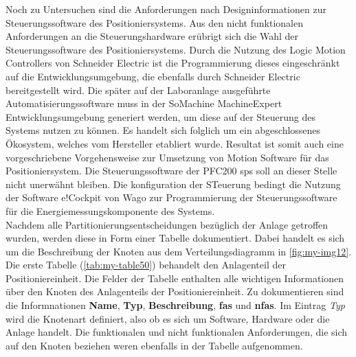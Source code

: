 \documentclass[../Bachelorarbeit.tex]{subfiles}
\begin{document}
Noch zu Untersuchen sind die Anforderungen nach Designinformationen zur Steuerungssoftware des Positioniersystems. Aus den nicht funktionalen Anforderungen an die Steuerungshardware erübrigt sich die Wahl der Steuerungssoftware des Positioniersystems. Durch die Nutzung des Logic Motion Controllers von Schneider Electric ist die Programmierung dieses eingeschränkt auf die Entwicklungsumgebung, die ebenfalls durch Schneider Electric bereitgestellt wird. Die später auf der Laboranlage ausgeführte Automatisierungssoftware muss in der SoMachine \bzw MachineExpert Entwicklungsumgebung generiert werden, um diese auf der Steuerung des Systems nutzen zu können. Es handelt sich folglich um ein abgeschlossenes Ökosystem, welches vom Hersteller etabliert wurde. Resultat ist somit auch eine vorgeschriebene Vorgehensweise zur Umsetzung von Motion Software für das Positioniersystem. Die Steuerungssoftware der PFC200 \ac{sps} soll an dieser Stelle nicht unerwähnt bleiben. Die konfiguration der STeuerung bedingt die Nutzung der Software e!Cockpit von Wago zur Programmierung der Steuerungssoftware für die Energiemessungskomponente des Systems.\\
Nachdem alle Partitionierungsentscheidungen bezüglich der Anlage getroffen wurden, werden diese in Form einer Tabelle dokumentiert. Dabei handelt es sich um die Beschreibung der Knoten aus dem Verteilungsdiagramm in \autoref{fig:my-img12}.\\
Die erste Tabelle (\autoref{tab:my-table50}) behandelt den Anlagenteil der Positioniereinheit. Die Felder der Tabelle enthalten alle wichtigen Informationen über den Knoten des Anlagenteils der Positioniereinheit. Zu dokumentieren sind die Informnationen \textbf{Name}, \textbf{Typ}, \textbf{Beschreibung}, \textbf{\acp{fa}} und \textbf{\acp{nfa}}. Im Eintrag \textit{Typ} wird die Knotenart definiert, also ob es sich um Software, Hardware oder die Anlage handelt. Die funktionalen und nicht funktionalen Anforderungen, die sich auf den Knoten beziehen weren ebenfalls in der Tabelle aufgenommen.
\end{document}
